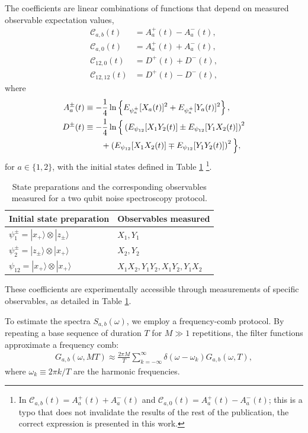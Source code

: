 \documentclass[%
 reprint,
superscriptaddress,
 amsmath,amssymb,
 aps,
pra,
]{revtex4-2}
\begin{document}
The coefficients are linear combinations of functions that depend on measured observable expectation values,
\begin{align}
    \label{eq::typo1}
    \mathcal{C}_{a,b}(t)&=A^+_a(t)-A^-_a(t),\\
    \label{eq::typo2}
    \mathcal{C}_{a,0}(t)&=A^+_a(t)+A^-_a(t),\\
    \mathcal{C}_{12,0}(t)&=D^+(t)+D^-(t),\\
    \mathcal{C}_{12,12}(t)&=D^+(t)-D^-(t),
\end{align}
where
\begin{align}
    A^\pm_a(t)&\equiv -\frac{1}{4}\ln\left\{E_{\psi_a^\pm}[X_a(t)]^2+E_{\psi_a^\pm}[Y_a(t)]^2\right\},\\
    D^\pm(t)&\equiv-\frac{1}{4}\ln\Big\{\left(E_{\psi_{12}}[X_1Y_2(t)]\pm E_{\psi_{12}}[Y_1X_2(t)]\right)^2\notag\\
    &\qquad+\left(E_{\psi_{12}}[X_1X_2(t)]\mp E_{\psi_{12}}[Y_1Y_2(t)]\right)^2\Big\},
\end{align}
for $a\in\{1,2\}$, with the initial states defined in Table \ref{tab:init} \footnote{In \cite{PhysRevA.95.022121} $\mathcal{C}_{a,b}(t)=A^+_a(t)+A^-_a(t)$ and $\mathcal{C}_{a,0}(t)=A^+_a(t)-A^-_a(t)$; this is a typo that does not invalidate the results of the rest of the publication, the correct expression is presented in this work.}.
\begin{table}[b!]
    \centering
    \renewcommand{\arraystretch}{1.5}
    \begin{tabular}{|l|l|}
        \hline
        \textbf{Initial state preparation} & \textbf{Observables measured} \\
        \hline
        $\psi^\pm_1=|x_+\rangle\otimes|z_\pm\rangle$ & $X_1, Y_1$ \\
        $\psi^\pm_2=|z_\pm\rangle\otimes|x_+\rangle$ & $X_2, Y_2$ \\
        $\psi_{12}=|x_+\rangle\otimes|x_+\rangle$ & $X_1X_2, Y_1Y_2, X_1Y_2, Y_1X_2$ \\
        \hline
    \end{tabular}
    \caption{State preparations and the corresponding observables measured for a two qubit noise spectroscopy protocol.}
    \label{tab:init}
\end{table}

These coefficients are experimentally accessible through measurements of specific observables, as detailed in Table \ref{tab:init}. 

To estimate the spectra $S_{a,b}(\omega)$, we employ a frequency-comb protocol. By repeating a base sequence of duration $T$ for $M \gg 1$ repetitions, the filter functions approximate a frequency comb:
\begin{align}\label{eq::comb}
    G_{a,b}(\omega,MT)\approx\frac{2\pi M}{T}\sum_{k=-\infty}^\infty\delta(\omega-\omega_k)G_{a,b}(\omega,T),
\end{align}
where $\omega_k\equiv 2\pi k/T$ are the harmonic frequencies. 
\end{document}
